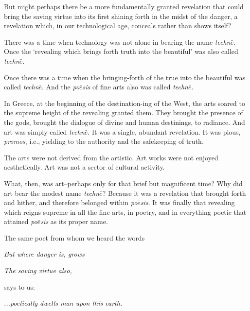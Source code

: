 \documentclass[paper=a4, fontsize=11pt,twoside]{scrartcl}
\begin{document}
But might perhaps there be a more fundamentally granted revelation that could bring the saving virtue into its first shining forth in the midst of the danger, a revelation which, in our technological age, conceals rather than shows itself?

There was a time when technology was not alone in bearing the name \textit{techn$\bar{e}$}. Once the `revealing which brings forth truth into the beautiful' was also called \textit{techn$\bar{e}$}.

Once there was a time when the bringing-forth of the true into the beautiful was called \textit{techn$\bar{e}$}. And the \textit{po$\bar{e}$sis} of fine arts also was called \textit{techn$\bar{e}$}.

In Greece, at the beginning of the destination-ing of the West, the arts soared to the supreme height of the revealing granted them. They brought the presence of the gods, brought the dialogue of divine and human destinings, to radiance. And art was simply called \textit{techn$\bar{e}$}. It was a single, abundant revelation. It was pious, \textit{promos}, i.e., yielding to the authority and the safekeeping of truth.

The arts were not derived from the artistic. Art works were not enjoyed aesthetically. Art was not a sector of cultural activity.

What, then, was art--perhaps only for that brief but magnificent time? Why did art bear the modest name \textit{techn$\bar{e}$}? Because it was a revelation that brought forth and hither, and therefore belonged within \textit{po$\bar{e}$sis}. It was finally that revealing which reigns supreme in all the fine arts, in poetry, and in everything poetic that attained \textit{po$\bar{e}$sis} as its proper name.

The same poet from whom we heard the words
\vspace{5mm}

\begin{center}
\textit{But where danger is, grows}

\textit{The saving virtue also,}
\end{center}

\vspace{5mm}

says to us:

\vspace{5mm}

\begin{center}
\textit{...poetically dwells man upon this earth.}
\end{center}
\end{document}
